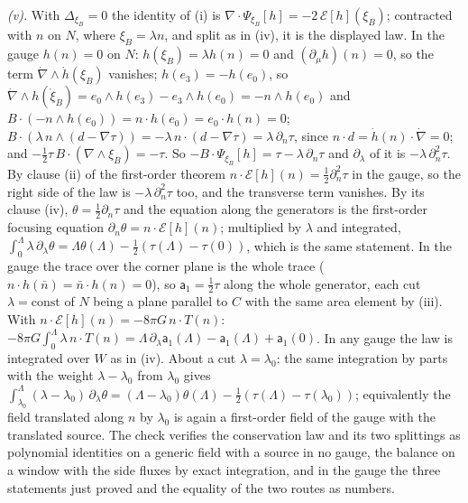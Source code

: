 \emph{(v).} With $\Delta_{\xi_{B}} = 0$ the identity of (i) is $\nabla \cdot \Psi_{\xi_{B}}[h] = -2\,\mathcal{E}[h](\xi_{B})$; contracted with $n$ on $N$, where $\xi_{B} = \lambda n$, and split as in (iv), it is the displayed law. In the gauge $h(n) = 0$ on $N$: $h(\xi_{B}) = \lambda h(n) = 0$ and $(\partial_{\mu}h)(n) = 0$, so the term $\dot\nabla \wedge \dot h(\xi_{B})$ vanishes; $h(e_{3}) = -h(e_{0})$, so $\dot\nabla \wedge h(\dot\xi_{B}) = e_{0} \wedge h(e_{3}) - e_{3} \wedge h(e_{0}) = -n \wedge h(e_{0})$ and $B \cdot (-n \wedge h(e_{0})) = n \cdot h(e_{0}) = e_{0} \cdot h(n) = 0$; $B \cdot (\lambda\,n \wedge (d - \nabla\tau)) = -\lambda\,n \cdot (d - \nabla\tau) = \lambda\,\partial_{n}\tau$, since $n \cdot d = \dot h(n) \cdot \dot\nabla = 0$; and $-\tfrac12\tau\,B \cdot (\nabla \wedge \xi_{B}) = -\tau$. So $-B \cdot \Psi_{\xi_{B}}[h] = \tau - \lambda\,\partial_{n}\tau$ and $\partial_{\lambda}$ of it is $-\lambda\,\partial_{n}^{2}\tau$. By clause (ii) of the first-order theorem $n \cdot \mathcal{E}[h](n) = \tfrac12\partial_{n}^{2}\tau$ in the gauge, so the right side of the law is $-\lambda\,\partial_{n}^{2}\tau$ too, and the transverse term vanishes. By its clause (iv), $\theta = \tfrac12\partial_{n}\tau$ and the equation along the generators is the first-order focusing equation $\partial_{n}\theta = n \cdot \mathcal{E}[h](n)$; multiplied by $\lambda$ and integrated, $\int_{0}^{\Lambda}\lambda\,\partial_{\lambda}\theta = \Lambda\theta(\Lambda) - \tfrac12(\tau(\Lambda) - \tau(0))$, which is the same statement. In the gauge the trace over the corner plane is the whole trace ($n \cdot h(\bar n) = \bar n \cdot h(n) = 0$), so $\mathsf{a}_{1} = \tfrac12\tau$ along the whole generator, each cut $\lambda = \text{const}$ of $N$ being a plane parallel to $C$ with the same area element by (iii). With $n \cdot \mathcal{E}[h](n) = -8\pi G\,n \cdot T(n)$: $-8\pi G\int_{0}^{\Lambda}\lambda\,n \cdot T(n) = \Lambda\,\partial_{\lambda}\mathsf{a}_{1}(\Lambda) - \mathsf{a}_{1}(\Lambda) + \mathsf{a}_{1}(0)$. In any gauge the law is integrated over $W$ as in (iv). About a cut $\lambda = \lambda_{0}$: the same integration by parts with the weight $\lambda - \lambda_{0}$ from $\lambda_{0}$ gives $\int_{\lambda_{0}}^{\Lambda}(\lambda - \lambda_{0})\,\partial_{\lambda}\theta = (\Lambda - \lambda_{0})\theta(\Lambda) - \tfrac12(\tau(\Lambda) - \tau(\lambda_{0}))$; equivalently the field translated along $n$ by $\lambda_{0}$ is again a first-order field of the gauge with the translated source. The check verifies the conservation law and its two splittings as polynomial identities on a generic field with a source in no gauge, the balance on a window with the side fluxes by exact integration, and in the gauge the three statements just proved and the equality of the two routes as numbers.

